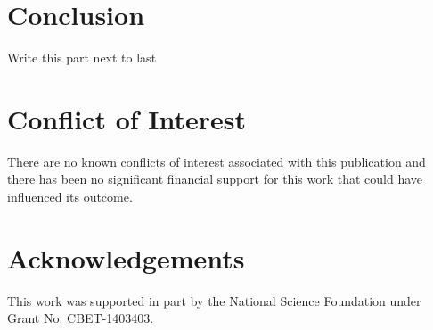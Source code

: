 \documentclass[preprint,12pt, a4paper]{elsarticle}
\begin{document}
\section{Conclusion}
\label{sec:conclusion}

Write this part next to last

\section{Conflict of Interest}
%

There are no known conflicts of interest associated with this publication and there has been no significant financial support for this work that could have influenced its outcome.

\section*{Acknowledgements}
\label{acknoledgements}

This work was supported in part by the National Science Foundation under Grant No. CBET-1403403.



\end{document}
